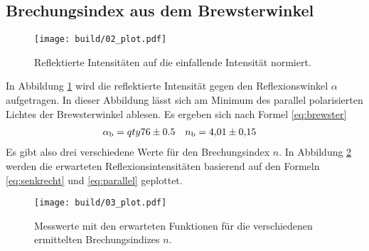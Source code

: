 \subsection{Brechungsindex aus dem Brewsterwinkel}
\begin{figure}
    \centering
    \texttt{[image: build/02\_plot.pdf]}
    \caption{Reflektierte Intensitäten auf die einfallende Intensität normiert.}
    \label{fig:I_r_einfach}
\end{figure}
In Abbildung \ref{fig:I_r_einfach} wird die reflektierte Intensität gegen den Reflexionswinkel $\alpha$ aufgetragen.
In dieser Abbildung lässt sich am Minimum des parallel polarisierten Lichtes der Brewsterwinkel ablesen.
Es ergeben sich nach Formel \eqref{eq:brewster}
\begin{align}
    \alpha_\text{b} &= qty{76 \pm 0.5} & n_\text{b} &= \num{4.01 \pm 0.15}
\end{align}
Es gibt also drei verschiedene Werte für den Brechungsindex $n$.
In Abbildung \ref{fig:I_r_kompliziert} werden die erwarteten Reflexionsintensitäten basierend auf den Formeln \eqref{eq:senkrecht} und 
\eqref{eq:parallel} geplottet.
\begin{figure}
    \centering
    \texttt{[image: build/03\_plot.pdf]}
    \caption{Messwerte mit den erwarteten Funktionen für die verschiedenen ermittelten Brechungsindizes $n$.}
    \label{fig:I_r_kompliziert}
\end{figure}